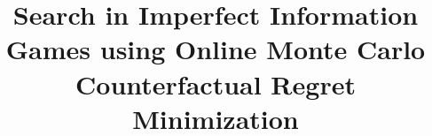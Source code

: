 \documentclass{aamas2015}
\begin{document}

\title{Search in Imperfect Information Games using Online Monte Carlo Counterfactual Regret Minimization}




%
%
%
%

%

\end{document}
